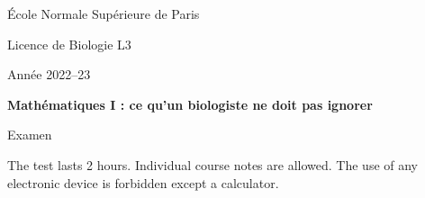 \documentclass[10pt]{article}
\title{}
\newcommand{\alglin}{/home/robin/ENSEIGN/Cours/MathBiologie/L3-ENS-Math1/Exercices/AlgLin}
\newcommand{\multivar}{/home/robin/ENSEIGN/Cours/MathBiologie/L3-ENS-Math1/Exercices/MultiVar}
\newcommand{\equadiff}{/home/robin/ENSEIGN/Cours/MathBiologie/L3-ENS-Math1/Exercices/EquaDiff}
\newcommand{\probas}{/home/robin/ENSEIGN/Cours/MathBiologie/L3-ENS-Math1/Exercices/Probas}
\begin{document}

\begin{centering}
  \footnotesize{\sc École Normale Supérieure de Paris} 
  
  \bigskip
  \footnotesize{\sc Licence de Biologie L3}
  
  \bigskip
  \footnotesize{\sc Année 2022–23}
  
  \bigskip
  {\bf Mathématiques I : ce qu’un biologiste ne doit pas ignorer} 
  
  \bigskip
  {\sc Examen}
  
\end{centering}

\bigskip
The test lasts 2 hours. 
Individual course notes are allowed.
The use of any electronic device is forbidden except a calculator.










\end{document}

